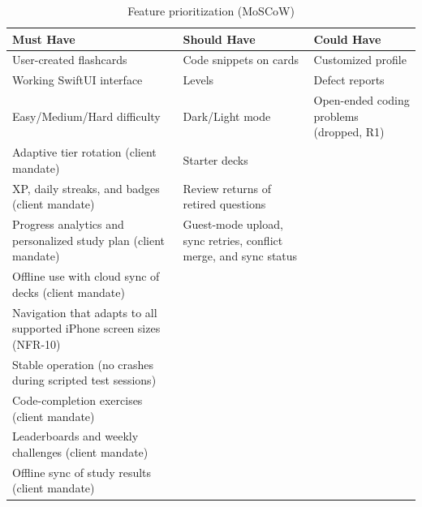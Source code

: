 \documentclass[12pt,letterpaper]{article}
\begin{document}
\begin{table}[H]
\centering
\caption{Feature prioritization (MoSCoW)}
\label{tab:moscow}
\begin{tabularx}{\textwidth}{@{}Y Y Y@{}}
\toprule
\textbf{Must Have} & \textbf{Should Have} & \textbf{Could Have} \\
\midrule
User-created flashcards & Code snippets on cards & Customized profile \\
Working SwiftUI interface & Levels & Defect reports \\
Easy/Medium/Hard difficulty & Dark/Light mode & Open-ended coding problems (dropped, R1) \\
Adaptive tier rotation (client mandate) & Starter decks & \\
XP, daily streaks, and badges (client mandate) & Review returns of retired questions & \\
Progress analytics and personalized study plan (client mandate) & Guest-mode upload, sync retries, conflict merge, and sync status & \\
Offline use with cloud sync of decks (client mandate) & & \\
Navigation that adapts to all supported iPhone screen sizes (NFR-10) & & \\
Stable operation (no crashes during scripted test sessions) & & \\
Code-completion exercises (client mandate) & & \\
Leaderboards and weekly challenges (client mandate) & & \\
Offline sync of study results (client mandate) & & \\
\bottomrule
\end{tabularx}
\end{table}

\end{document}
